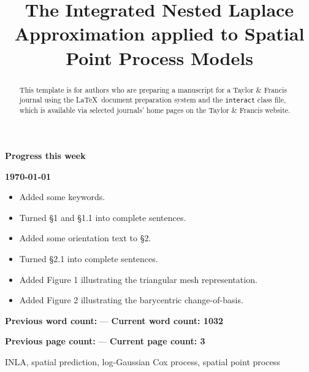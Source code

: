 \documentclass[]{interact}
\begin{document}
{\Large\bf Progress this week}

{\large\bf\today}

\begin{itemize}

\item Added some keywords.

\item Turned \S 1 and \S 1.1 into complete sentences.

\item Added some orientation text to \S 2.

\item Turned \S 2.1 into complete sentences.

\item Added Figure 1 illustrating the triangular mesh representation.

\item Added Figure 2 illustrating the barycentric change-of-basis.

\end{itemize}

\vfill

\textbf{Previous word count:} --- \hfill \textbf{Current word count: 1032}

\textbf{Previous page count:} --- \hfill \textbf{Current page count: 3}

\pagebreak


\title{The Integrated Nested Laplace Approximation applied to Spatial Point Process Models}

\author{
}

\maketitle

\begin{abstract}
This template is for authors who are preparing a manuscript for a Taylor \& Francis journal using the \LaTeX\ document preparation system and the \texttt{interact} class file, which is available via selected journals' home pages on the Taylor \& Francis website.
\end{abstract}

\begin{keywords}
INLA, spatial prediction, log-Gaussian Cox process, spatial point process
\end{keywords}
\end{document}
